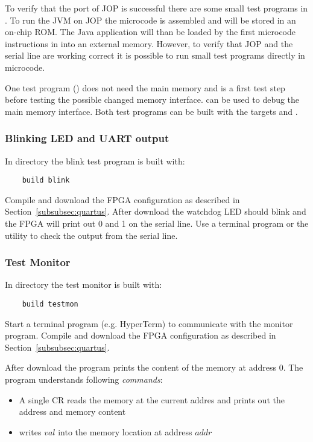 To verify that the port of JOP is successful there are some small
test programs in . To run the JVM on JOP the
microcode  is assembled and will be stored in an
on-chip ROM. The Java application will than be loaded by the first
microcode instructions in  into an external memory.
However, to verify that JOP and the serial line are working correct
it is possible to run small test programs directly in microcode.

One test program () does not need the main memory
and is a first test step before testing the possible changed memory
interface.  can be used to debug the main memory
interface. Both test programs can be built with the 
targets  and .

\subsubsection{Blinking LED and UART output}

In directory  the blink test program is built with:
%
\begin{verbatim}
    build blink
\end{verbatim}
%
Compile and download the FPGA configuration as described in
Section~\ref{subsubsec:quartus}. After download the watchdog LED
should blink and the FPGA will print out 0 and 1 on the serial line.
Use a terminal program or the utility  to check the
output from the serial line.

\subsubsection{Test Monitor}

In directory  the test monitor is built with:
%
\begin{verbatim}
    build testmon
\end{verbatim}
%
Start a terminal program (e.g. HyperTerm) to communicate with the
monitor program. Compile and download the FPGA configuration as
described in Section~\ref{subsubsec:quartus}.

After download the program prints the content of the memory at
address 0. The program understands following \emph{commands}:

\begin{itemize}
    \item A single CR reads the memory at the current addres
    and prints out the address and memory content
    \item {} writes $val$ into the memory location at
    address $addr$
\end{itemize}

